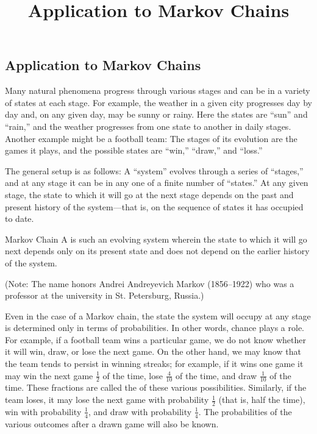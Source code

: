 \documentclass{ximera}
\title{Application to Markov Chains} \license{CC BY-NC-SA 4.0}
\begin{document}
\begin{abstract}
\end{abstract}
\maketitle

\begin{onlineOnly}
\section*{Application to Markov Chains}
\end{onlineOnly}

Many natural phenomena progress through various stages and can be in a variety of states at each stage. For example, the weather in a given city progresses day by day and, on any given day, may be sunny or rainy. Here the states are ``sun'' and ``rain,'' and the weather progresses from one state to another in daily stages. Another example might be a football team: The stages of its evolution are the games it plays, and the possible states are ``win,'' ``draw,'' and ``loss.''


The general setup is as follows: A ``system'' evolves through a series of ``stages,'' and at any stage it can be in any one of a finite number of ``states.'' At any given stage, the state to which it will go at the next stage depends on the past and present history of the system---that is, on the sequence of states it has occupied to date.


\begin{definition}{Markov Chain}\label{007191}
A  is such an evolving system wherein the state to which it will go next depends only on its present state and does not depend on the earlier history of the system.
\end{definition}

(Note: The name honors Andrei Andreyevich Markov (1856--1922) who was a professor at the university in St. Petersburg, Russia.)

Even in the case of a Markov chain, the state the system will occupy at any stage is determined only in terms of probabilities. In other words, chance plays a role. For example, if a football team wins a particular game, we do not know whether it will win, draw, or lose the next game. On the other hand, we may know that the team tends to persist in winning streaks; for example, if it wins one game it may win the next game $\frac{1}{2}$ of the time, lose $\frac{4}{10}$ of the time, and draw $\frac{1}{10}$ of the time. These fractions are called the  of these various possibilities. Similarly, if the team loses, it may lose the next game with probability $\frac{1}{2}$ (that is, half the time), win with probability $\frac{1}{4}$, and draw with probability $\frac{1}{4}$. The probabilities of the various outcomes after a drawn game will also be known.
\end{document}
